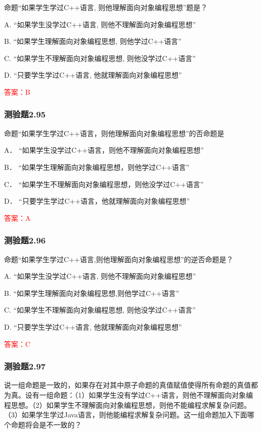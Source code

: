 \documentclass[UTF8, heading=true]{ctexart}
\begin{document}
命题“如果学生学过C++语言, 则他理解面向对象编程思想”题是？

A. “如果学生没学过C++语言, 则他不理解面向对象编程思想”

B. “如果学生理解面向对象编程思想, 则他学过C++语言”

C. “如果学生不理解面向对象编程思想, 则他没学过C++语言”

D. “只要学生学过C++语言, 他就理解面向对象编程思想”

\textcolor{red}{答案：B}

\subsubsection{测验题2.95}

命题“如果学生学过C++语言，则他理解面向对象编程思想”的否命题是

A．
“如果学生没学过C++语言，则他不理解面向对象编程思想”

B．
“如果学生理解面向对象编程思想，则他学过C++语言”

C．
“如果学生不理解面向对象编程思想，则他没学过C++语言”

D．
“只要学生学过C++语言，他就理解面向对象编程思想”

\textcolor{red}{答案：A}

\subsubsection{测验题2.96}

命题“如果学生学过C++语言,则他理解面向对象编程思想”的逆否命题是？

A. “如果学生没学过C++语言, 则他不理解面向对象编程思想”

B. “如果学生理解面向对象编程思想,则他学过C++语言”

C. “如果学生不理解面向对象编程思想, 则他没学过C++语言”

D. “只要学生学过C++语言, 他就理解面向对象编程思想”

\textcolor{red}{答案：C}

\subsubsection{测验题2.97}

说一组命题是一致的，如果存在对其中原子命题的真值赋值使得所有命题的真值都为真。设有一组命题：（1）如果学生没有学过C++语言，则他不理解面向对象编程思想。（2）如果学生不理解面向对象编程思想，则他不能编程求解复杂问题。（3）如果学生学过Java语言，则他能编程求解复杂问题。这一组命题加入下面哪个命题将会是不一致的？
\end{document}
